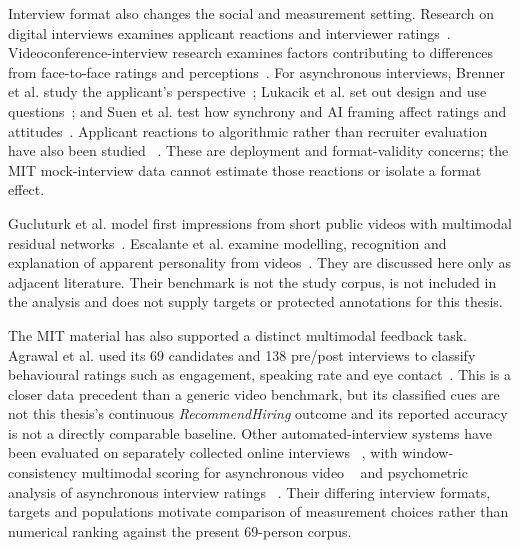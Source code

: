 Interview format also changes the social and measurement setting. Research on digital interviews
examines applicant reactions and interviewer ratings~\cite{Langer2017DigitalInterviews}.
Videoconference-interview research examines factors contributing to differences from
face-to-face ratings and perceptions~\cite{Basch2021Camera}. For asynchronous interviews,
Brenner et al. study the applicant's perspective~\cite{Brenner2016AVIReactions}; Lukacik et al.
set out design and use questions~\cite{Lukacik2022AVIDesign}; and Suen et al. test how synchrony
and AI framing affect ratings and attitudes~\cite{Suen2019SynchronyAI}.
Applicant reactions to algorithmic rather than recruiter evaluation have also been studied
~\cite{Oostrom2024ApplicantReactions}. These are deployment and format-validity concerns;
the MIT mock-interview data cannot estimate those reactions or isolate a format effect.

Gucluturk et al. model first impressions from short public videos with multimodal residual
networks~\cite{Gucluturk2018}. Escalante et al. examine modelling, recognition and explanation
of apparent personality from videos~\cite{Escalante2022}. They are discussed here only as
adjacent literature. Their benchmark is not the study corpus, is not included in the analysis and
does not supply targets or protected annotations for this thesis.

The MIT material has also supported a distinct multimodal feedback task. Agrawal et al. used its
69 candidates and 138 pre/post interviews to classify behavioural ratings such as engagement,
speaking rate and eye contact~\cite{Agrawal2020}. This is a closer data precedent than a generic
video benchmark, but its classified cues are not this thesis's continuous
\emph{RecommendHiring} outcome and its reported accuracy is not a directly comparable baseline.
Other automated-interview systems have been evaluated on separately collected online interviews
~\cite{Chen2017}, with window-consistency multimodal scoring for asynchronous video
~\cite{Lv2024} and psychometric analysis of asynchronous interview ratings
~\cite{Koutsoumpis2024}. Their differing interview formats, targets and populations motivate
comparison of measurement choices rather than numerical
ranking against the present 69-person corpus.

